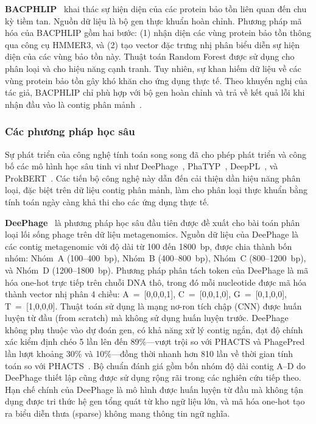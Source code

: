 \textbf{BACPHLIP}~\cite{hockenberry2021bacphlip} khai thác sự hiện diện của các protein bảo tồn liên quan đến chu kỳ tiềm tan. Nguồn dữ liệu là bộ gen thực khuẩn hoàn chỉnh. Phương pháp mã hóa của BACPHLIP gồm hai bước: (1) nhận diện các vùng protein bảo tồn thông qua công cụ HMMER3, và (2) tạo vector đặc trưng nhị phân biểu diễn sự hiện diện của các vùng bảo tồn này. Thuật toán Random Forest được sử dụng cho phân loại và cho hiệu năng cạnh tranh. Tuy nhiên, sự khan hiếm dữ liệu về các vùng protein bảo tồn gây khó khăn cho ứng dụng thực tế. Theo khuyến nghị của tác giả, BACPHLIP chỉ phù hợp với bộ gen hoàn chỉnh và trả về kết quả lỗi khi nhận đầu vào là contig phân mảnh~\cite{shang2023phatyp}.

\subsubsection{Các phương pháp học sâu}

Sự phát triển của công nghệ tính toán song song đã cho phép phát triển và công bố các mô hình học sâu tinh vi như DeePhage~\cite{wu2021deephage}, PhaTYP~\cite{shang2023phatyp}, DeepPL~\cite{zhang2024deeppl}, và ProkBERT~\cite{ligeti2024prokbert}. Các tiến bộ công nghệ này dẫn đến cải thiện dần hiệu năng phân loại, đặc biệt trên dữ liệu contig phân mảnh, làm cho phân loại thực khuẩn bằng tính toán ngày càng khả thi cho các ứng dụng thực tế.

\textbf{DeePhage}~\cite{wu2021deephage} là phương pháp học sâu đầu tiên được đề xuất cho bài toán phân loại lối sống phage trên dữ liệu metagenomics. Nguồn dữ liệu của DeePhage là các contig metagenomic với độ dài từ 100 đến 1800~bp, được chia thành bốn nhóm: Nhóm~A (100--400~bp), Nhóm~B (400--800~bp), Nhóm~C (800--1200~bp), và Nhóm~D (1200--1800~bp). Phương pháp phân tách token của DeePhage là mã hóa one-hot trực tiếp trên chuỗi DNA thô, trong đó mỗi nucleotide được mã hóa thành vector nhị phân 4 chiều: A~=~[0,0,0,1], C~=~[0,0,1,0], G~=~[0,1,0,0], T~=~[1,0,0,0]. Thuật toán sử dụng là mạng nơ-ron tích chập (CNN) được huấn luyện từ đầu (from scratch) mà không sử dụng huấn luyện trước. DeePhage không phụ thuộc vào dự đoán gen, có khả năng xử lý contig ngắn, đạt độ chính xác kiểm định chéo 5 lần lên đến 89\%---vượt trội so với PHACTS và PhagePred lần lượt khoảng 30\% và 10\%---đồng thời nhanh hơn 810 lần về thời gian tính toán so với PHACTS~\cite{wu2021deephage}. Bộ chuẩn đánh giá gồm bốn nhóm độ dài contig A--D do DeePhage thiết lập cũng được sử dụng rộng rãi trong các nghiên cứu tiếp theo. Hạn chế chính của DeePhage là mô hình được huấn luyện từ đầu mà không tận dụng được tri thức hệ gen tổng quát từ kho ngữ liệu lớn, và mã hóa one-hot tạo ra biểu diễn thưa (sparse) không mang thông tin ngữ nghĩa.

